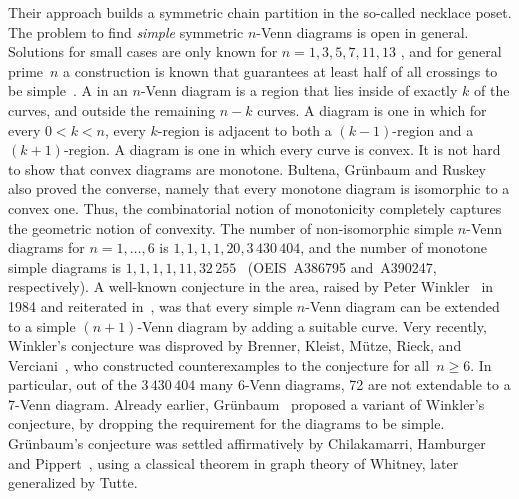 Their approach builds a symmetric chain partition in the so-called necklace poset.
The problem to find \emph{simple} symmetric $n$-Venn diagrams is open in general.
Solutions for small cases are only known for $n=1,3,5,7,11,13$ \cite{MR3231031}, and for general prime~$n$ a construction is known that guarantees at least half of all crossings to be simple~\cite{MR2114190}.
%
A  in an $n$-Venn diagram is a region that lies inside of exactly $k$ of the curves, and outside the remaining $n-k$ curves.
A  diagram is one in which for every $0<k<n$, every $k$-region is adjacent to both a $(k-1)$-region and a $(k+1)$-region.
A  diagram is one in which every curve is convex.
It is not hard to show that convex diagrams are monotone.
Bultena, Gr\"unbaum and Ruskey~\cite{DBLP:conf/cccg/BultenaGR99} also proved the converse, namely that every monotone diagram is isomorphic to a convex one.
Thus, the combinatorial notion of monotonicity completely captures the geometric notion of convexity.
%
The number of non-isomorphic simple $n$-Venn diagrams for $n=1,\ldots,6$ is $1,1,1,1,20,3\,430\,404$, and the number of monotone simple diagrams is $1,1,1,1,11,32\,255$~\cite{MR1486434,MR1789063,venn_preprint} (OEIS~A386795 and~A390247, respectively).
%
A well-known conjecture in the area, raised by Peter Winkler~\cite{MR777726} in 1984 and reiterated in~\cite{DBLP:journals/cacm/Winkler12}, was that every simple $n$-Venn diagram can be extended to a simple $(n+1)$-Venn diagram by adding a suitable curve.
Very recently, Winkler's conjecture was disproved by Brenner, Kleist, Mütze, Rieck, and Verciani~\cite{venn_preprint}, who constructed counterexamples to the conjecture for all~$n \geq 6$.
In particular, out of the $3\,430\,404$ many 6-Venn diagrams, 72 are not extendable to a 7-Venn diagram.
Already earlier, Gr\"unbaum~\cite{MR1208440} proposed a variant of Winkler's conjecture, by dropping the requirement for the diagrams to be simple.
Gr\"unbaum's conjecture was settled affirmatively by Chilakamarri, Hamburger and Pippert~\cite{MR1400982}, using a classical theorem in graph theory of Whitney, later generalized by Tutte.
%
